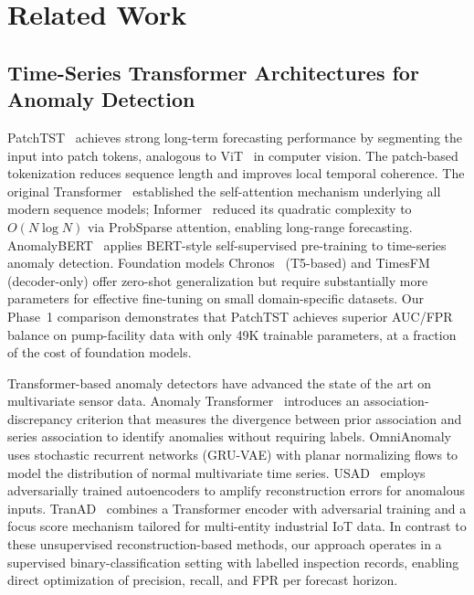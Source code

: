 ﻿\documentclass[twocolumn]{article}
\begin{document}
\section{Related Work}
\label{sec:related}

\subsection{Time-Series Transformer Architectures for Anomaly Detection}

PatchTST~\cite{nie2023patchtst} achieves strong long-term forecasting
performance by segmenting the input into patch tokens, analogous to
ViT~\cite{dosovitskiy2020vit} in computer vision.
The patch-based tokenization reduces sequence length and improves
local temporal coherence.
The original Transformer~\cite{vaswani2017attention} established the
self-attention mechanism underlying all modern sequence models;
Informer~\cite{zhou2021informer} reduced its quadratic complexity to
$O(N\log N)$ via ProbSparse attention, enabling long-range forecasting.
AnomalyBERT~\cite{jeong2023anomalybert} applies BERT-style
self-supervised pre-training to time-series anomaly detection.
Foundation models Chronos~\cite{ansari2024chronos} (T5-based)
and TimesFM~\cite{das2024timesfm} (decoder-only) offer zero-shot
generalization but require substantially more parameters for
effective fine-tuning on small domain-specific datasets.
Our Phase~1 comparison demonstrates that PatchTST achieves superior
AUC/FPR balance on pump-facility data with only 49K trainable
parameters, at a fraction of the cost of foundation models.

Transformer-based anomaly detectors have advanced the state of the art
on multivariate sensor data.
Anomaly Transformer~\cite{xu2022anomaly} introduces an
association-discrepancy criterion that measures the divergence between
prior association and series association to identify anomalies without
requiring labels.
OmniAnomaly~\cite{su2019omni} uses stochastic recurrent networks
(GRU-VAE) with planar normalizing flows to model the distribution of
normal multivariate time series.
USAD~\cite{audibert2020usad} employs adversarially trained
autoencoders to amplify reconstruction errors for anomalous inputs.
TranAD~\cite{tuli2022tranad} combines a Transformer encoder with
adversarial training and a focus score mechanism tailored for
multi-entity industrial IoT data.
In contrast to these unsupervised reconstruction-based methods,
our approach operates in a supervised binary-classification setting
with labelled inspection records, enabling direct optimization of
precision, recall, and FPR per forecast horizon.
\end{document}
